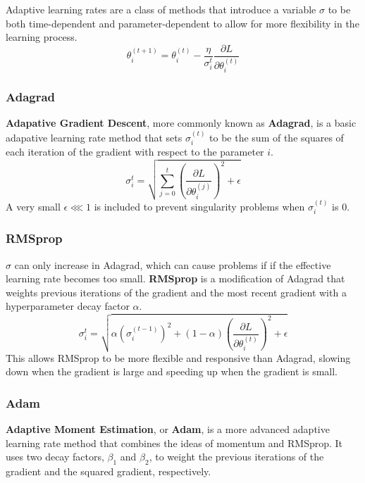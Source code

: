 \documentclass[12pt]{report}
\theoremstyle{definition}
\theoremstyle{remark}
\begin{document}
Adaptive learning rates are a class of methods that introduce a variable $\sigma$ to be both time-dependent and parameter-dependent to allow for more flexibility in the learning process.
\begin{equation}
    \theta_{i}^{(t+1)} = \theta_{i}^{(t)} - \frac{\eta}{\sigma_i^t}\frac{\partial L}{\partial \theta_i^{(t)}}
\end{equation}

\subsubsection{Adagrad}
\textbf{Adapative Gradient Descent}, more commonly known as \textbf{Adagrad}, is a basic adapative learning rate method that sets $\sigma_i^{(t)}$ to be the sum of the squares of each iteration of the gradient with respect to the parameter $i$.
\begin{equation}
    \sigma_i^t = \sqrt{\sum_{j=0}^t {\left(\frac{\partial L}{\partial \theta_i^{(j)}}\right)}^2 + \epsilon}
\end{equation}
A very small $\epsilon \lll 1$ is included to prevent singularity problems when $\sigma_i^{(t)}$ is $0$.

\subsubsection{RMSprop}
$\sigma$ can only increase in Adagrad, which can cause problems if if the effective learning rate becomes too small. \textbf{RMSprop} is a modification of Adagrad that weights previous iterations of the gradient and the most recent gradient with a hyperparameter decay factor $\alpha$.
\begin{equation}
    \sigma_i^t = \sqrt{\alpha {(\sigma_i^{(t-1)})}^2 + (1-\alpha)\left(\frac{\partial L}{\partial \theta_i^{(t)}}\right)^2 + \epsilon}
\end{equation}
This allows RMSprop to be more flexible and responsive than Adagrad, slowing down when the gradient is large and speeding up when the gradient is small.
\subsubsection{Adam}
\textbf{Adaptive Moment Estimation}, or \textbf{Adam}, is a more advanced adaptive learning rate method that combines the ideas of momentum and RMSprop. It uses two decay factors, $\beta_1$ and $\beta_2$, to weight the previous iterations of the gradient and the squared gradient, respectively.
\end{document}
